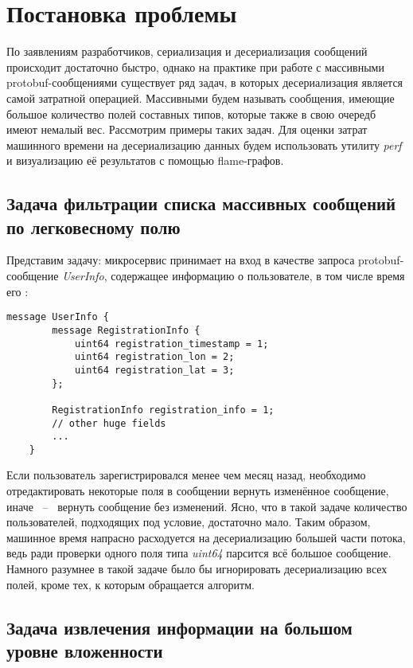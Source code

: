 \section{Постановка проблемы}

По заявлениям разработчиков, сериализация и десериализация сообщений происходит достаточно быстро, однако
на практике при работе с массивными protobuf-сообщениями существует ряд задач, в которых десериализация является самой затратной операцией.
Массивными будем называть сообщения, имеющие большое количество полей составных типов, которые также в свою очередб имеют немалый вес.
Рассмотрим примеры таких задач. Для оценки затрат машинного времени на десериализацию данных будем использовать утилиту \textit{perf} и визуализацию её результатов с помощью flame-графов.

\subsection{Задача фильтрации списка массивных сообщений по легковесному полю}
\label{sec_problem:sec:problem1}

Представим задачу: микросервис принимает на вход в качестве запроса protobuf-сообщение \textit{UserInfo}, содержащее информацию о пользователе,
в том числе время его :

\begin{lstlisting}[style=CodeListing, label={sec_problem:listing:userinfo}, caption={protobuf-сообщение UserInfo}]
    message UserInfo {
        message RegistrationInfo {
            uint64 registration_timestamp = 1;
            uint64 registration_lon = 2;
            uint64 registration_lat = 3;
        };

        RegistrationInfo registration_info = 1;
        // other huge fields
        ... 
    }
\end{lstlisting}

Если пользователь зарегистрировался менее чем месяц назад, необходимо отредактировать некоторые поля в сообщении вернуть изменённое сообщение,
иначе ~--~ вернуть сообщение без изменений. Ясно, что в такой задаче количество пользователей, подходящих под условие, достаточно мало.
Таким образом, машинное время напрасно расходуется на десериализацию большей части потока, ведь ради проверки одного поля типа \textit{uint64} парсится всё большое сообщение.
Намного разумнее в такой задаче было бы игнорировать десериализацию всех полей, кроме тех, к которым обращается алгоритм.

\subsection{Задача извлечения информации на большом уровне вложенности}

